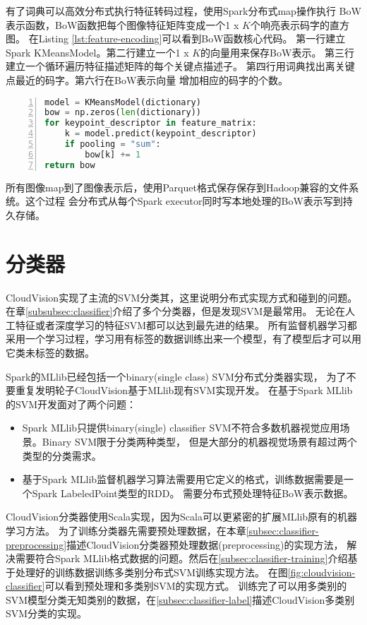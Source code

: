 有了词典可以高效分布式执行特征转码过程，使用Spark分布式map操作执行
BoW表示函数，BoW函数把每个图像特征矩阵变成一个1 x $K$个响亮表示码字的直方图。
在Listing \ref{lst:feature-encoding}可以看到BoW函数核心代码。
第一行建立Spark KMeansModel。第二行建立一个1 x $K$的向量用来保存BoW表示。
第三行建立一个循环遍历特征描述矩阵的每个关键点描述子。
第四行用词典找出离关键点最近的码字。第六行在BoW表示向量
增加相应的码字的个数。
\begin{lstlisting}[language=Python,
                   basicstyle=\small,
                   numbers=left,
                   showstringspaces=false,
                   caption={BoW特征转码核心代码},
                   label={lst:feature-encoding}]
model = KMeansModel(dictionary)
bow = np.zeros(len(dictionary))
for keypoint_descriptor in feature_matrix:
    k = model.predict(keypoint_descriptor)
    if pooling = "sum":
        bow[k] += 1
return bow
\end{lstlisting}

所有图像map到了图像表示后，使用Parquet格式保存保存到Hadoop兼容的文件系统。这个过程
会分布式从每个Spark executor同时写本地处理的BoW表示写到持久存储。


\section{分类器}
\label{sec:cloudvision_classifier}
CloudVision实现了主流的SVM分类其，这里说明分布式实现方式和碰到的问题。
在章\ref{subsubsec:classifier}介绍了多个分类器，但是发现SVM是最常用。
无论在人工特征或者深度学习的特征SVM都可以达到最先进的结果。
所有监督机器学习都采用一个学习过程，学习用有标签的数据训练出来一个模型，有了模型后才可以用
它类未标签的数据。


Spark的MLlib已经包括一个binary(single class) SVM分布式分类器实现，
为了不要重复发明轮子CloudVision基于MLlib现有SVM实现开发。
在基于Spark MLlib的SVM开发面对了两个问题：
\begin{itemize}
  \item Spark MLlib只提供binary(single) classifier SVM不符合多数机器视觉应用场景。Binary SVM限于分类两种类型，
        但是大部分的机器视觉场景有超过两个类型的分类需求。
  \item 基于Spark MLlib监督机器学习算法需要用它定义的格式，训练数据需要是一个Spark LabeledPoint类型的RDD。
        需要分布式预处理特征BoW表示数据。
\end{itemize}

CloudVision分类器使用Scala实现，因为Scala可以更紧密的扩展MLlib原有的机器学习方法。
为了训练分类器先需要预处理数据，在本章\ref{subsec:classifier-preprocessing}描述CloudVision分类器预处理数据(preprocessing)的实现方法，
解决需要符合Spark MLlib格式数据的问题。然后在\ref{subsec:classifier-training}介绍基于处理好的训练数据训练多类别分布式SVM训练实现方法。
在图\ref{fig:cloudvision-classifier}可以看到预处理和多类别SVM的实现方式。
训练完了可以用多类别的SVM模型分类无知类别的数据，在\ref{subsec:classifier-label}描述CloudVision多类别SVM分类的实现。

